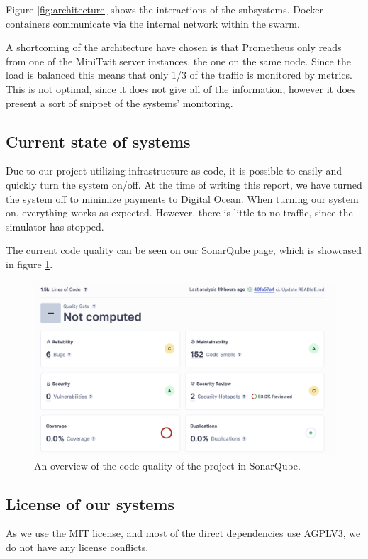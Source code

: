 Figure \ref{fig:architecture} shows the interactions of the subsystems. Docker containers communicate via the internal network within the swarm.

A shortcoming of the architecture have chosen is that Prometheus only reads from one of the MiniTwit server instances, the one on the same node. Since the load is balanced this means that only 1/3 of the traffic is monitored by metrics. This is not optimal, since it does not give all of the information, however it does present a sort of snippet of the systems' monitoring.


\subsection{Current state of systems}
Due to our project utilizing infrastructure as code, it is possible to easily and quickly turn the system on/off. At the time of writing this report, we have turned the system off to minimize payments to Digital Ocean. When turning our system on, everything works as expected. However, there is little to no traffic, since the simulator has stopped. 

The current code quality can be seen on our SonarQube page, which is showcased in figure \ref{fig:sonarQubeOverview}.

\begin{figure}[H]
    \centering
    \includegraphics[width=\textwidth]{images/sonarStats.png}
    \caption{An overview of the code quality of the project in SonarQube.}
    \label{fig:sonarQubeOverview}
\end{figure}

\subsection{License of our systems}
As we use the MIT license, and most of the direct dependencies use AGPLV3, we do not have any license conflicts.